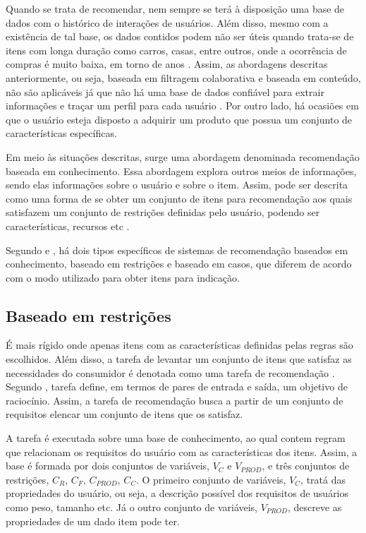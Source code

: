 Quando se trata de recomendar, nem sempre se terá à disposição uma base de dados com o histórico de interações de usuários. Além disso, mesmo com a existência de tal base,  os dados contidos podem não ser úteis quando trata-se de itens com longa duração como carros, casas, entre outros, onde a ocorrência de compras é muito baixa, em torno de anos \cite{Jannach2010}. Assim, as abordagens descritas anteriormente, ou seja, baseada em filtragem colaborativa e baseada em conteúdo, não são aplicáveis já que não há uma base de dados confiável para extrair informações e traçar um perfil para cada usuário  \cite{Ricci2010}. Por outro lado, há ocasiões em que o usuário esteja disposto a adquirir um produto que possua um conjunto de características específicas. 

Em meio às situações descritas, surge uma abordagem denominada recomendação baseada em conhecimento. Essa abordagem explora outros meios de informações, sendo elas informações sobre o usuário e sobre o item.
Assim, pode ser descrita como uma forma de se obter um conjunto de itens para recomendação aos quais satisfazem um conjunto de restrições definidas pelo usuário, podendo ser características, recursos etc \cite{Jannach2010}.

Segundo  e , há dois tipos específicos de sistemas de recomendação baseados em conhecimento, baseado em restrições e baseado em casos, que diferem de acordo com o modo utilizado para obter itens para indicação.

\subsection{Baseado em restrições}
    É mais rígido onde apenas itens com as características definidas pelas regras são escolhidos. Além disso, a tarefa de levantar um conjunto de itens que satisfaz as necessidades do consumidor é denotada como uma tarefa de recomendação \cite{Ricci2010}. Segundo , tarefa define, em termos de pares de entrada e saída, um objetivo de raciocínio. Assim, a tarefa de recomendação busca a partir de um conjunto de requisitos elencar um conjunto de itens que os satisfaz.
    
    A tarefa é executada sobre uma base de conhecimento, ao qual contem regram que relacionam os requisitos do usuário com as características dos itens. Assim, a base é formada por dois conjuntos de variáveis, $V_C$ e $V_{PROD}$, e três conjuntos de restrições, $C_R$, $C_F$, $C_{PROD}$, $C_C$.
    O primeiro conjunto de variáveis, $V_C$, tratá das propriedades do usuário, ou seja, a descrição possível dos requisitos de usuários como peso, tamanho etc. Já o outro conjunto de variáveis, $V_{PROD}$, descreve as propriedades de um dado item pode ter.
    
